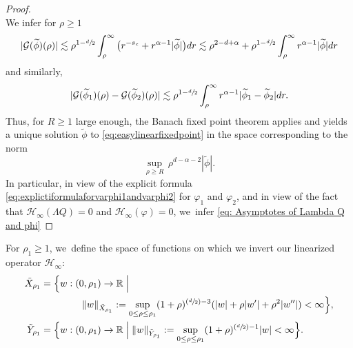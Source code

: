 \documentclass[10pt]{amsart}
\newcommand{\Psfrac}[2]{(\sfrac{#1}{#2})}
\let\ra\rightarrow
\theoremstyle{plain}
\theoremstyle{definition}
\begin{document}
\begin{proof}
\[\]
We infer for $\rho\geq 1$
\[
|\mathcal G(\widetilde{\phi})(\rho)| \lesssim \rho^{1-\sfrac{d}{2}}\int_\rho^\infty\big(r^{-s_c}+r^{\alpha-1}|\widetilde{\phi}|\big)dr\lesssim \rho^{2-d+\alpha}+\rho^{1-\sfrac{d}{2}}\int_\rho^\infty r^{\alpha-1}|\widetilde{\phi}| dr
\]
and similarly,
\[
|\mathcal G(\widetilde{\phi}_1)(\rho)-\mathcal G(\widetilde{\phi}_2)(\rho)| \lesssim \rho^{1-\sfrac{d}{2}}\int_\rho^\infty r^{\alpha-1}|\widetilde{\phi}_1-\widetilde{\phi}_2| dr.
\]
Thus, for $R\geq 1$ large enough, the Banach fixed point theorem applies and yields a unique solution $\widetilde{\phi}$ to \eqref{eq:easylinearfixedpoint} in the space corresponding to the norm
\[
\sup_{\rho\geq R}\,\rho^{d-\alpha-2}|\widetilde{\phi}|.
\]
In particular, in view of the explicit formula \eqref{eq:explictiformulaforvarphi1andvarphi2} for $\varphi_1$ and $\varphi_2$, and in view of the fact that $\mathcal H_\infty(\Lambda Q)=0$ and $\mathcal H_\infty(\varphi)=0$, we~infer \eqref{eq: Asymptotes of Lambda Q and phi}
\end{proof}

For $\rho_1\ge 1$, we~define the space of functions on which we invert our linearized operator $\mathcal H_\infty$:
\begin{equation}
\begin{aligned}
\tilde X_{\rho_1}&=\Big\{w:(0,\rho_1)\ra \mathbb R\Bigm|\\
&\hspace*{1.5cm}\Vert w\Vert_{\tilde X_{\rho_1}}:=\sup_{0\le \rho\le\rho_1}(1+\rho)^{\Psfrac{d}{2}-3}(|w|+\rho|w'|+\rho^2|w''|)<\infty\Big\},\\
\tilde Y_{\rho_1}&=\Big\{w:(0,\rho_1)\ra \mathbb R\Bigm|\Vert w\Vert_{\tilde Y_{\rho_1}}:=\sup_{0\le \rho\le\rho_1}(1+\rho)^{\Psfrac{d}{2}-1}|w|<\infty\Big\}.
\end{aligned}
\end{equation}
\end{document}
